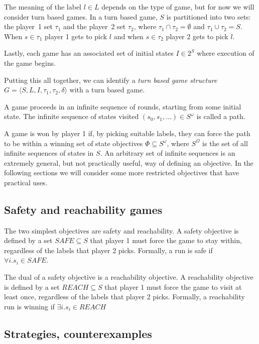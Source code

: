 \documentclass{book}
\theoremstyle{definition}
\begin{document}
The meaning of the label $l \in L$ depends on the type of game, but for now we will consider turn based games. In a turn based game, $S$ is partitioned into two sets: the player~1 set $\tau_1$ and the player~2 set $\tau_2$, where $\tau_1 \cap \tau_2 = \emptyset$ and $ \tau_1 \cup \tau_2 = S$. When $s \in \tau_1$ player 1 gets to pick $l$ and when $s \in \tau_2$ player 2 gets to pick $l$.

Lastly, each game has an associated set of initial states $I \in 2^S$ where execution of the game begins.

Putting this all together, we can identify a \emph{turn based game structure} $G = \langle S,L,I,\tau_1,\tau_2,\delta \rangle$ with a turn based game.

A game proceeds in an infinite sequence of rounds, starting from some initial state. The infinite sequence of states visited $(s_0, s_1,\ldots) \in S^\omega$ is called a path. 

A game is won by player 1 if, by picking suitable labels, they can force the path to be within a winning set of state objectives $\Phi \subseteq S^\omega$, where $S^\Omega$ is the set of all infinite sequences of states in $S$. An arbitrary set of infinite sequences is an extremely general, but not practically useful, way of defining an objective. In the following sections we will consider some more restricted objectives that have practical uses.

\subsection{Safety and reachability games}

The two simplest objectives are safety and reachability. A safety objective is defined by a set $SAFE \subseteq S$ that player 1 must force the game to stay within, regardless of the labels that player 2 picks. Formally, a run is safe if $\forall i. s_i \in SAFE$. 

The dual of a safety objective is a reachability objective. A reachability objective is defined by a set $REACH \subseteq S$ that player 1 must force the game to visit at least once, regardless of the labels that player 2 picks. Formally, a reachability run is winning if $\exists i. s_i \in REACH$

\subsection{Strategies, counterexamples}
\end{document}
